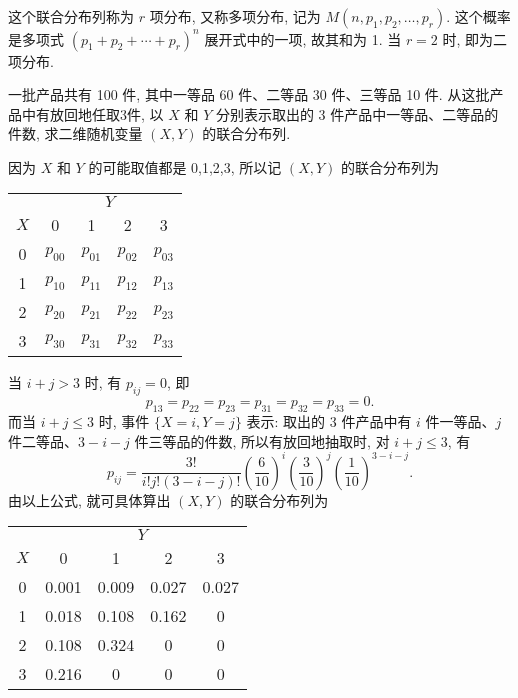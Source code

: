   这个联合分布列称为 $r$ 项分布, 又称多项分布, 记为 $M(n,p_1,p_2,\ldots,p_r)$. 这个概率
  是多项式 $(p_1+p_2+\cdots+p_r)^n$ 展开式中的一项, 故其和为 1. 当 $r=2$ 时, 即为二项分布.
  \begin{example}\label{exam:3.1.4}
    一批产品共有 100 件, 其中一等品 60 件、二等品 30 件、三等品 10 件. 
    从这批产品中有放回地任取3件, 以 $X$ 和 $Y$ 分别表示取出的 3 件产品中一等品、二等品的件数, 求二维随机变量 $(X,Y)$ 的联合分布列.
  \end{example}
  \begin{solution}
    因为 $X$ 和 $Y$ 的可能取值都是 0,1,2,3, 所以记 $(X,Y)$ 的联合分布列为
    \begin{center}
      \begin{tabular}{ccccc}
        \toprule
          & \multicolumn{4}{c}{$Y$} \\
        \cmidrule{2-5}
        $X$ & 0&  1&  2&  3 \\
        \midrule
        0&  $p_{00}$& $p_{01}$& $p_{02}$& $p_{03}$\\
        \midrule
        1&  $p_{10}$& $p_{11}$& $p_{12}$& $p_{13}$\\
        \midrule
        2&  $p_{20}$& $p_{21}$& $p_{22}$& $p_{23}$\\
        \midrule
        3&  $p_{30}$& $p_{31}$& $p_{32}$& $p_{33}$\\
        \bottomrule
      \end{tabular}
    \end{center}
    当 $i+j>3$ 时, 有 $p_{ij}=0$, 即
    \[
      p_{13}=p_{22}=p_{23}=p_{31}=p_{32}=p_{33}=0.
    \]
    而当 $i+j\leq 3$ 时, 事件 $\{X=i,Y=j\}$ 表示: 取出的 3 件产品中有 $i$ 件一等品、$j$ 件二等品、$3-i-j$ 件三等品的件数, 
    所以有放回地抽取时, 对 $i+j\leq 3$, 有
    \[
      p_{i j}=\frac{3 !}{i ! j !(3-i-j) !}\left(\frac{6}{10}\right)^{i}\left(\frac{3}{10}\right)^{j}\left(\frac{1}{10}\right)^{3-i-j}.
    \]
    由以上公式, 就可具体算出 $(X,Y)$ 的联合分布列为
    \begin{center}
      \begin{tabular}{ccccc}
        \toprule
          & \multicolumn{4}{c}{$Y$} \\
        \cmidrule{2-5}
        $X$ & 0&  1&  2&  3 \\
        \midrule
        0&  0.001   & 0.009   & 0.027   & 0.027   \\
        \midrule
        1&  0.018   & 0.108   & 0.162   & 0       \\
        \midrule
        2&  0.108   & 0.324   & 0       & 0       \\
        \midrule
        3&  0.216   & 0       & 0       & 0       \\
        \bottomrule
      \end{tabular}
    \end{center}
  \end{solution}
